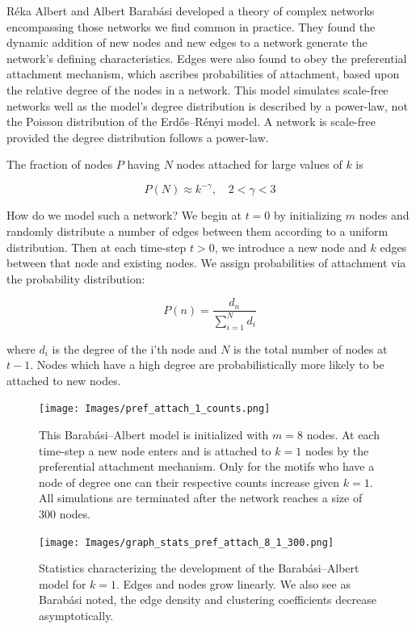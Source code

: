 Réka Albert and Albert Barabási developed a theory of complex networks 
encompassing those networks we find common in practice. They found the dynamic addition
of new nodes and new edges to a network generate the network's defining characteristics.
Edges were also found to obey the preferential attachment
mechanism, which ascribes probabilities of attachment, based upon the relative degree of the nodes in a network. 
This model simulates scale-free networks well as the model's
degree distribution is described by a power-law, not the Poisson distribution of the Erdős–Rényi model. 
A network is scale-free provided the degree distribution follows a power-law. 

The fraction of nodes $P$ having $N$ nodes attached for large values of $k$ is 

$$
P(N) \approx k^{-\gamma} , \quad 2< \gamma <3
$$

How do we model such a network? We begin at $t=0$ by initializing $m$ nodes and randomly distribute a number of edges between them
according to a uniform distribution. Then at each time-step $t > 0$, we introduce a new node 
and $k$ edges between that node and existing nodes. We assign probabilities of attachment via the
 probability distribution:

$$
P(n) = \frac{d_n}{\sum^{N}_{i=1} d_i}
$$

\noindent where $d_i$ is the degree of the i'th node and $N$ is the total number of nodes at $t-1$.
 Nodes which have a high degree are probabilistically more likely to be attached to new nodes. 


\begin{figure}[h!]
    \texttt{[image: Images/pref\_attach\_1\_counts.png]}
    \centering
    \caption{This Barabási–Albert model is initialized with $m=8$ nodes.
    At each time-step a new node enters and is attached to $k=1$ nodes by the preferential attachment mechanism.
     Only for the motifs who have a node
    of degree one can their respective counts increase given $k=1$. All simulations are terminated after the 
    network reaches a size of $300$ nodes.}
    \label{fig:BA1}
\end{figure}


\begin{figure}[h!]
    \texttt{[image: Images/graph\_stats\_pref\_attach\_8\_1\_300.png]}
    \centering
    \caption{Statistics characterizing the development of the Barabási–Albert model for $k=1$.
    Edges and nodes grow linearly. We also see as Barabási noted, the edge density and clustering coefficients decrease asymptotically.}
\end{figure}


